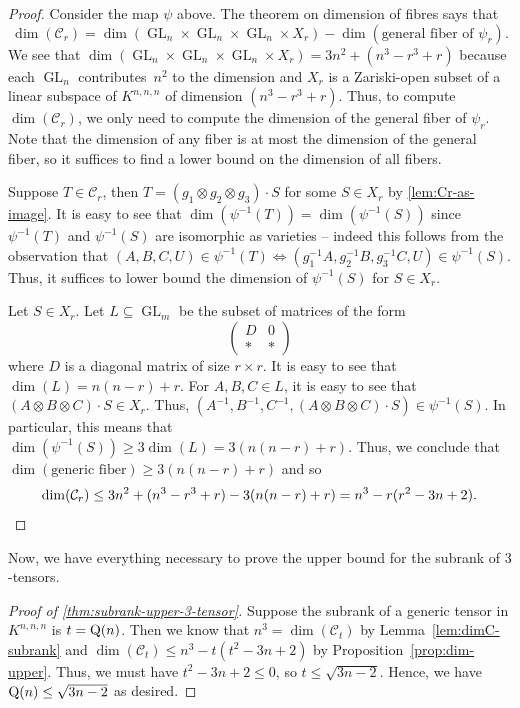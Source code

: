 \documentclass[11pt]{article}
\theoremstyle{definition}
\theoremstyle{remark}
\newcommand{\gensubrank}{{\rm Q}}
\newcommand{\GL}{\operatorname{GL}}
\begin{document}
\begin{proof} 
Consider the map $\psi$ above. The theorem on dimension of fibres says that 
$$
\dim(\mathcal{C}_r) = \dim(\GL_n \times \GL_n \times \GL_n \times X_r) - \dim(\text{general fiber of } \psi_r).
$$
We see that $\dim(\GL_n \times \GL_n \times \GL_n \times X_r) = 3n^2 + (n^3-r^3 + r)$ because each $\GL_n$ contributes~$n^2$ to the dimension and $X_r$ is a Zariski-open subset of a linear subspace of $K^{n,n,n}$ of dimension $(n^3-r^3 + r)$. Thus, to compute $\dim(\mathcal{C}_r)$, we only need to compute the dimension of the general fiber of $\psi_r$. Note that the dimension of any fiber is at most the dimension of the general fiber, so it suffices to find a lower bound on the dimension of all fibers.

Suppose $T \in \mathcal{C}_r$, then $T = (g_1 \otimes g_2 \otimes g_3) \cdot S$ for some $S \in X_r$ by \autoref{lem:Cr-as-image}. It is easy to see that $\dim(\psi^{-1}(T)) = \dim(\psi^{-1}(S))$ since $\psi^{-1}(T)$ and $\psi^{-1}(S)$ are isomorphic as varieties -- indeed this follows from the observation that $(A,B,C,U) \in \psi^{-1}(T) \Longleftrightarrow (g_1^{-1}A, g_2^{-1}B, g_3^{-1}C, U) \in \psi^{-1}(S)$. Thus, it suffices to lower bound the dimension of $\psi^{-1}(S)$ for $S \in X_r$.

Let $S \in X_r$.
Let $L \subseteq \GL_m$ be the subset of matrices of the form 
\[
\begin{pmatrix} D & 0 \\ \ast & \ast \end{pmatrix}
\]
where $D$ is a diagonal matrix of size $r \times r$. It is easy to see that $\dim(L) = n(n-r) + r$. For $A,B,C \in L$, it is easy to see that $(A \otimes B \otimes C) \cdot S \in X_r$. Thus, $(A^{-1}, B^{-1}, C^{-1}, (A \otimes B \otimes C) \cdot S) \in \psi^{-1}(S)$. In particular, this means that $\dim(\psi^{-1}(S)) \geq 3 \dim(L) = 3(n(n-r) + r)$. Thus, we conclude that $\dim(\text{generic fiber}) \geq 3(n(n-r) + r)$ and so
\[
\dim(\mathcal{C}_r) \leq 3n^2 + (n^3-r^3 + r) - 3(n(n-r) + r) = n^3 - r(r^2-3n+2).\qedhere
\]

\end{proof}

Now, we have everything necessary to prove the upper bound for the subrank of $3$-tensors.
\begin{proof} [Proof of \autoref{thm:subrank-upper-3-tensor}]
Suppose the subrank of a generic tensor in $K^{n,n,n}$ is $t = \gensubrank(n)$. Then we know that $n^3 = \dim(\mathcal{C}_t)$ by Lemma~\ref{lem:dimC-subrank} and $\dim(\mathcal{C}_t) \leq n^3 - t(t^2 - 3n+2)$ by  Proposition~\ref{prop:dim-upper}. Thus, we must have $t^2 - 3n + 2 \leq 0$, so $t \leq \sqrt{3n-2}$. Hence, we have $\gensubrank(n) \leq \sqrt{3n-2}$ as desired. 
\end{proof}
\end{document}
